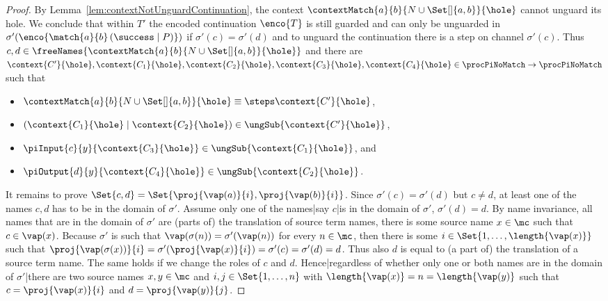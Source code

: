 \documentclass[]{article}
\begin{document}
\begin{proof}
	By Lemma~\ref{lem:contextNotUnguardContinuation}, the context $ \contextMatch{a}{b}{N \cup \Set[]{ a, b }}{\hole} $ cannot unguard its hole. We conclude that within $ T' $ the encoded continuation $ \enco{T} $ is still guarded and can only be unguarded in $ \sigma'\!\left( \enco{\match{a}{b}\left( \success \mid P \right)} \right) $ if $ \sigma'(c) = \sigma'(d) $ and to unguard the continuation there is a step on channel $ \sigma'(c) $.
	Thus $ c, d \in \freeNames{\contextMatch{a}{b}{N \cup \Set[]{ a, b }}{\hole}} $ and there are $ \context{C'}{\hole}, \context{C_1}{\hole}, \context{C_2}{\hole}, \context{C_3}{\hole}, \context{C_4}{\hole} \in \procPiNoMatch \to \procPiNoMatch $ such that
	\begin{itemize}
		\item $ \contextMatch{a}{b}{N \cup \Set[]{ a, b }}{\hole} \equiv\steps \context{C'}{\hole} $,
		\item $ \left( \context{C_1}{\hole} \mid \context{C_2}{\hole} \right) \in \ungSub{\context{C'}{\hole}} $,
		\item $ \piInput{c}{y}{\context{C_3}{\hole}} \in \ungSub{\context{C_1}{\hole}} $, and
		\item $ \piOutput{d}{y}{\context{C_4}{\hole}} \in \ungSub{\context{C_2}{\hole}} $.
	\end{itemize}
	
	It remains to prove $ \Set{ c, d } = \Set{ \proj{\vap\!\left( a \right)}{i}, \proj{\vap\!\left( b \right)}{i} } $. Since $ \sigma'\!\left( c \right) = \sigma'\!\left( d \right) $ but $ c \neq d $, at least one of the names $ c, d $ has to be in the domain of $ \sigma' $. Assume only one of the names|say $ c $|is in the domain of $ \sigma' $, \ie $ \sigma'\!\left( d \right) = d $. By name invariance, all names that are in the domain of $ \sigma' $ are (parts of) the translation of source term names, \ie there is some source name $ x \in \mc $ such that $ c \in \vap\!\left( x \right) $.
	Because $ \sigma' $ is such that $ \vap\!\left( \sigma\!\left( n \right) \right) = \sigma'\!\left( \vap\!\left( n \right) \right) $ for every $ n \in \mc $, then there is some $ i \in \Set{ 1, \ldots, \length{\vap\!\left( x \right)} } $ such that $ \proj{\vap\!\left( \sigma\!\left( x \right) \right)}{i} = \sigma'\!\left( \proj{\vap\!\left( x \right)}{i} \right) = \sigma'\!\left( c \right) = \sigma'\!\left( d \right) = d $. Thus also $ d $ is equal to (a part of) the translation of a source term name. The same holds if we change the roles of $ c $ and $ d $.
	Hence|regardless of whether only one or both names are in the domain of $ \sigma' $|there are two source names $ x, y \in \mc $ and $ i, j \in \Set{ 1, \ldots, n } $ with $ \length{\vap\!\left( x \right)} = n = \length{\vap\!\left( y \right)} $ such that $ c = \proj{\vap\!\left( x \right)}{i} $ and $ d = \proj{\vap\!\left( y \right)}{j} $.
	

\end{proof}
\end{document}
